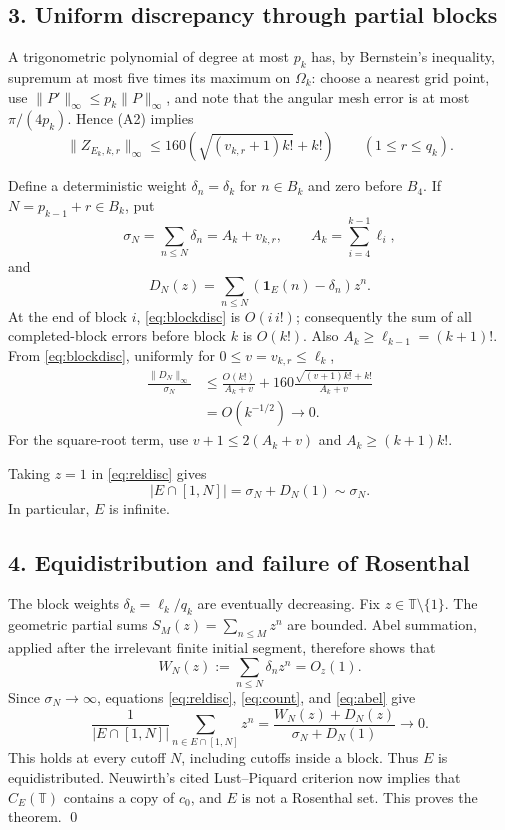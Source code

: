 \documentclass[11pt]{amsart}
\newcommand{\T}{\mathbb T}
\newcommand{\1}{\mathbf 1}
\newcommand{\card}[1]{\lvert #1\rvert}
\theoremstyle{definition}
\theoremstyle{remark}
\begin{document}
\subsection*{3. Uniform discrepancy through partial blocks}

A trigonometric polynomial of degree at most $p_k$ has, by Bernstein's
inequality, supremum at most five times its maximum on $\Omega_k$: choose a
nearest grid point, use $\|P'\|_\infty\le p_k\|P\|_\infty$, and note that
the angular mesh error is at most $\pi/(4p_k)$.  Hence (A2) implies
\begin{equation}\label{eq:blockdisc}
 \|Z_{E_k,k,r}\|_\infty
 \le160\left(\sqrt{(v_{k,r}+1)k!}+k!\right)
 \qquad(1\le r\le q_k).
\end{equation}

Define a deterministic weight $\delta_n=\delta_k$ for $n\in B_k$ and zero
before $B_4$.  If $N=p_{k-1}+r\in B_k$, put
\[
 \sigma_N=\sum_{n\le N}\delta_n
 =A_k+v_{k,r},\qquad A_k=\sum_{i=4}^{k-1}\ell_i,
\]
and
\[
 D_N(z)=\sum_{n\le N}(\1_E(n)-\delta_n)z^n.
\]
At the end of block $i$, \eqref{eq:blockdisc} is $O(i\,i!)$; consequently
the sum of all completed-block errors before block $k$ is $O(k!)$.  Also
$A_k\ge\ell_{k-1}=(k+1)!$.  From \eqref{eq:blockdisc}, uniformly for
$0\le v=v_{k,r}\le\ell_k$,
\begin{equation}\label{eq:reldisc}
\begin{aligned}
 \frac{\|D_N\|_\infty}{\sigma_N}
 &\le \frac{O(k!)}{A_k+v}
 +160\frac{\sqrt{(v+1)k!}+k!}{A_k+v}\\
 &=O(k^{-1/2})\longrightarrow0.
\end{aligned}
\end{equation}
For the square-root term, use
$v+1\le2(A_k+v)$ and $A_k\ge(k+1)k!$.

Taking $z=1$ in \eqref{eq:reldisc} gives
\begin{equation}\label{eq:count}
 \card{E\cap[1,N]}=\sigma_N+D_N(1)\sim\sigma_N.
\end{equation}
In particular, $E$ is infinite.

\subsection*{4. Equidistribution and failure of Rosenthal}

The block weights $\delta_k=\ell_k/q_k$ are eventually decreasing.  Fix
$z\in\T\setminus\{1\}$.  The geometric partial sums
$S_M(z)=\sum_{n\le M}z^n$ are bounded.  Abel summation, applied after the
irrelevant finite initial segment, therefore shows that
\begin{equation}\label{eq:abel}
 W_N(z):=\sum_{n\le N}\delta_nz^n=O_z(1).
\end{equation}
Since $\sigma_N\to\infty$, equations \eqref{eq:reldisc},
\eqref{eq:count}, and \eqref{eq:abel} give
\[
 \frac{1}{\card{E\cap[1,N]}}
 \sum_{n\in E\cap[1,N]}z^n
 =\frac{W_N(z)+D_N(z)}{\sigma_N+D_N(1)}\longrightarrow0.
\]
This holds at every cutoff $N$, including cutoffs inside a block.  Thus
$E$ is equidistributed.  Neuwirth's cited Lust--Piquard criterion now
implies that $C_E(\T)$ contains a copy of $c_0$, and $E$ is not a Rosenthal
set.  This proves the theorem. \qed
\end{document}
